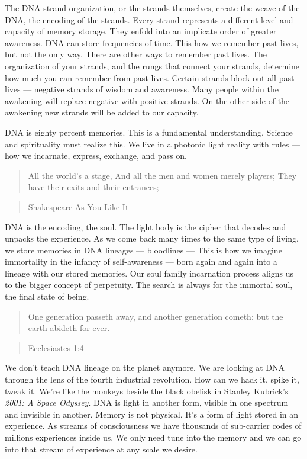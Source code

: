 \documentclass[letterpaper,11pt,twoside,titlepage,onecolumn,openany]{book}
\begin{document}
The DNA strand organization, or the strands themselves, create the weave
of the DNA, the encoding of the strands. Every strand represents a
different level and capacity of memory storage. They enfold into an
implicate order of greater awareness. DNA can store frequencies of time.
This how we remember past lives, but not the only way. There are other
ways to remember past lives. The organization of your strands, and the
rungs that connect your strands, determine how much you can remember
from past lives. Certain strands block out all past lives --- negative
strands of wisdom and awareness. Many people within the awakening will
replace negative with positive strands. On the other side of the
awakening new strands will be added to our capacity.

DNA is eighty percent memories. This is a fundamental understanding.
Science and spirituality must realize this. We live in a photonic light
reality with rules --- how we incarnate, express, exchange, and pass on.

\begin{quote}
All the world's a stage, And all the men and women merely players; They
have their exits and their entrances;
\end{quote}

\begin{quote}
Shakespeare As You Like It
\end{quote}

DNA is the encoding, the soul. The light body is the cipher that decodes
and unpacks the experience. As we come back many times to the same type
of living, we store memories in DNA lineages --- bloodlines --- This is
how we imagine immortality in the infancy of self-awareness --- born
again and again into a lineage with our stored memories. Our soul family
incarnation process aligns us to the bigger concept of perpetuity. The
search is always for the immortal soul, the final state of being.

\begin{quote}
One generation passeth away, and another generation cometh: but the
earth abideth for ever.
\end{quote}

\begin{quote}
Ecclesiastes 1:4
\end{quote}

We don't teach DNA lineage on the planet anymore. We are looking at DNA
through the lens of the fourth industrial revolution. How can we hack
it, spike it, tweak it. We're like the monkeys beside the black obelisk
in Stanley Kubrick's \emph{2001: A Space Odyssey}. DNA is light in
another form, visible in one spectrum and invisible in another. Memory
is not physical. It's a form of light stored in an experience. ​​​​​​​As
streams of consciousness we have thousands of sub-carrier codes of
millions experiences inside us. We only need tune into the memory and we
can go into that stream of experience at any scale we desire.
\end{document}
